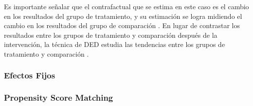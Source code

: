 \documentclass[../../main.tex]{subfiles}
\begin{document}
Es importante señalar que el contrafactual que se estima en este caso es el cambio en los resultados del grupo de tratamiento, y su estimación se logra midiendo el cambio en los resultados del grupo de comparación \cite{gertler-2016}. En lugar de contrastar los resultados entre los grupos de tratamiento y comparación después de la intervención, la técnica de DED estudia las tendencias entre los grupos de tratamiento y comparación \cite{gertler-2016}.




\subsubsection{Efectos Fijos}

\subsubsection{Propensity Score Matching}

\end{document}
